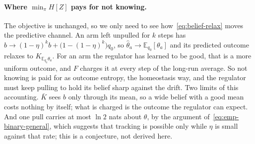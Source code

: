 \documentclass[11pt]{article}
\theoremstyle{remark}
\newcommand{\E}{\mathbb E}
\newcommand{\1}{\mathds{1}}
\newcommand{\Hf}[1]{H\!\left[#1\right]}
\begin{document}
\paragraph{Where $\min_\pi\Hf{Z}$ pays for not knowing.}
The objective is unchanged, so we only need to see how~\eqref{eq:belief-relax} moves the predictive channel.
An arm left unpulled for $k$ steps has $b\to(1-\eta)^k b+\big(1-(1-\eta)^k\big)q_0$, so $\hat\theta_a\to\E_{q_0}[\theta_a]$ and its predicted outcome relaxes to $K_{\E_{q_0}\theta_a}$.
For an arm the regulator has learned to be good, that is a more uniform outcome, and $F$ charges it at every step of the long-run average.
So not knowing is paid for as outcome entropy, the homeostasis way, and the regulator must keep pulling to hold its belief sharp against the drift.
Two limits of this accounting.
$\bar K$ sees $b$ only through its mean, so a wide belief with a good mean costs nothing by itself; what is charged is the outcome the regulator can expect.
And one pull carries at most $\ln2$ nats about $\theta$, by the argument of~\eqref{eq:emp-binary-general}, which suggests that tracking is possible only while $\eta$ is small against that rate; this is a conjecture, not derived here.
\end{document}
